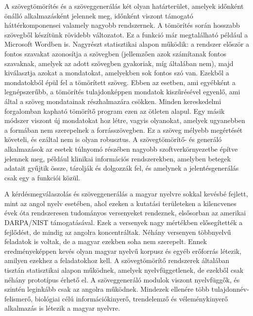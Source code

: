 \begin{multicols}{2}
  A szövegtömörítés és a szöveggenerálás két olyan határterület, amelyek időnként önálló alkalmazásként jelennek meg, időn\-ként viszont támogató háttérkomponensei valamely nagyobb rendszernek. A tömörítés során hosszabb szövegből ké\-szí\-tünk rövidebb változatot. Ez a funkció már megtalálható például a Microsoft Wordben is. Nagyrészt statisztikai alapon működik: a rendszer először a fontos szavakat azonosítja a szövegben (jel\-lem\-ző\-en azok számítanak fontos szavaknak, amelyek az adott szövegben gyakoriak, míg általában nem), majd kiválasztja azokat a mondatokat, amelyekben sok fontos szó van. Ezekből a mondatokból épül fel a tömörített szöveg. Ebben az esetben, ami egyébként a legnépszerűbb, a tömörítés tulajdonképpen mondatok kiszűrésével egyenlő, ami által a szöveg mondatainak rész\-hal\-ma\-zá\-ra csök\-ken. Minden kereskedelmi forgalomban kapható tömörítő program ezen az ötleten alapul. Egy másik módszer viszont új mondatokat hoz létre, vagyis olyanokat, amelyek ugyanebben a formában nem szerepelnek a forrásszövegben. Ez a szöveg mélyebb megértését követeli, és ezáltal nem is olyan robusztus. A szövegtömörítő- és generáló alkalmazások az esetek túlnyomó részében nagyobb szoftverkörnyezetbe építve jelennek meg, például klinikai információs rendszerekben, amelyben betegek adatait gyűjtik össze, tárolják és dolgozzák fel, és amelynek a jelentésgenerálás csak egy a funkciói közül.  


  A kérdésmegválaszolás és szöveggenerálás a magyar nyelvre sokkal kevésbé fejlett, mint az angol nyelv esetében, ahol ezeken a kutatási területeken a kilencvenes évek óta rendszeresen tudományos versenyeket rendeznek, elsősorban az amerikai DAR\-PA/NIST támogatásával. Ezek a ver\-se\-nyek nagy mértékben elősegítették a fej\-lő\-dést, de mindig az angolra kon\-cent\-rál\-tak. Néhány versenyen többnyelvű feladatok is voltak, de a magyar ezekben soha nem szerepelt. Ennek eredményeképpen kevés olyan magyar nyelvű korpusz és egyéb erőforrás létezik, amilyen ezekhez a feladatokhoz kell. A szövegtömörítő rendszerek általában tisztán statisztikai alapon működnek, amelyek nyelvfüggetlenek, de ezekből csak néhány prototípus érhető el. A szöveggeneráló modulok viszont nyelvfüggők, és szintén leginkább csak az angolra működnek. Mindezek ellenére több tulajdonnév-felismerő, biológiai célú  információkinyerő, trend\-elem\-ző és véleménykinyerő alkalmazás is létezik a magyar nyelvre. 


\end{multicols}
